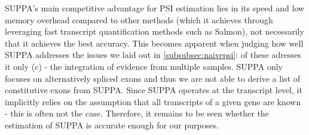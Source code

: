 SUPPA's main competitive advantage for PSI estimation lies in its speed and low memory overhead compared to other methods \cite{suppa} (which it achieves through leveraging fast transcript quantification methods such as Salmon), not necessarily that it achieves the best accuracy. This becomes apparent when judging how well SUPPA addresses the issues we laid out in \ref{subsubsec:naivepsi}: of these adresses it only (c) - the integration of evidence from multiple samples. SUPPA only focuses on alternatively spliced exons and thus we are not able to derive a list of constitutive exons from SUPPA. Since SUPPA operates at the transcript level, it implicitly relies on the assumption that all transcripts of a given gene are known - this is often not the case. Therefore, it remains to be seen whether the estimation of SUPPA is accurate enough for our purposes.





